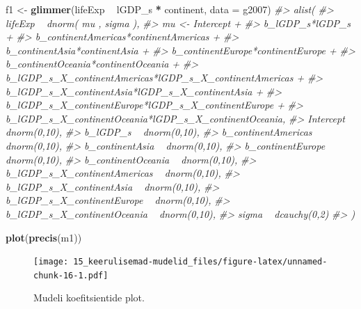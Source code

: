 \documentclass[]{book}
\newenvironment{Shaded}{\begin{snugshade}}{\end{snugshade}}
\newcommand{\KeywordTok}[1]{\textcolor[rgb]{0.13,0.29,0.53}{\textbf{#1}}}
\newcommand{\DataTypeTok}[1]{\textcolor[rgb]{0.13,0.29,0.53}{#1}}
\newcommand{\StringTok}[1]{\textcolor[rgb]{0.31,0.60,0.02}{#1}}
\newcommand{\CommentTok}[1]{\textcolor[rgb]{0.56,0.35,0.01}{\textit{#1}}}
\newcommand{\OperatorTok}[1]{\textcolor[rgb]{0.81,0.36,0.00}{\textbf{#1}}}
\newcommand{\NormalTok}[1]{#1}
\begin{document}
\begin{Shaded}
\begin{Highlighting}[]
\NormalTok{f1 <-}\StringTok{ }\KeywordTok{glimmer}\NormalTok{(lifeExp }\OperatorTok{~}\StringTok{ }\NormalTok{lGDP_s }\OperatorTok{*}\StringTok{ }\NormalTok{continent, }\DataTypeTok{data =}\NormalTok{ g2007)}
\CommentTok{#> alist(}
\CommentTok{#>     lifeExp ~ dnorm( mu , sigma ),}
\CommentTok{#>     mu <- Intercept +}
\CommentTok{#>         b_lGDP_s*lGDP_s +}
\CommentTok{#>         b_continentAmericas*continentAmericas +}
\CommentTok{#>         b_continentAsia*continentAsia +}
\CommentTok{#>         b_continentEurope*continentEurope +}
\CommentTok{#>         b_continentOceania*continentOceania +}
\CommentTok{#>         b_lGDP_s_X_continentAmericas*lGDP_s_X_continentAmericas +}
\CommentTok{#>         b_lGDP_s_X_continentAsia*lGDP_s_X_continentAsia +}
\CommentTok{#>         b_lGDP_s_X_continentEurope*lGDP_s_X_continentEurope +}
\CommentTok{#>         b_lGDP_s_X_continentOceania*lGDP_s_X_continentOceania,}
\CommentTok{#>     Intercept ~ dnorm(0,10),}
\CommentTok{#>     b_lGDP_s ~ dnorm(0,10),}
\CommentTok{#>     b_continentAmericas ~ dnorm(0,10),}
\CommentTok{#>     b_continentAsia ~ dnorm(0,10),}
\CommentTok{#>     b_continentEurope ~ dnorm(0,10),}
\CommentTok{#>     b_continentOceania ~ dnorm(0,10),}
\CommentTok{#>     b_lGDP_s_X_continentAmericas ~ dnorm(0,10),}
\CommentTok{#>     b_lGDP_s_X_continentAsia ~ dnorm(0,10),}
\CommentTok{#>     b_lGDP_s_X_continentEurope ~ dnorm(0,10),}
\CommentTok{#>     b_lGDP_s_X_continentOceania ~ dnorm(0,10),}
\CommentTok{#>     sigma ~ dcauchy(0,2)}
\CommentTok{#> )}
\end{Highlighting}
\end{Shaded}

\begin{Shaded}
\end{Shaded}

\begin{Shaded}
\begin{Highlighting}[]
\KeywordTok{plot}\NormalTok{(}\KeywordTok{precis}\NormalTok{(m1))}
\end{Highlighting}
\end{Shaded}

\begin{figure}
\centering
\texttt{[image: 15\_keerulisemad-mudelid\_files/figure-latex/unnamed-chunk-16-1.pdf]}
\caption{\label{fig:unnamed-chunk-16}Mudeli koefitsientide plot.}
\end{figure}
\end{document}
